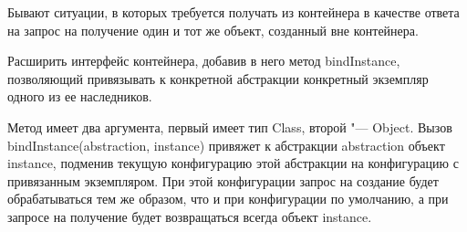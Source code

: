 Бывают ситуации, в которых требуется получать из контейнера в качестве ответа на запрос на получение один и тот же объект, созданный вне контейнера.

\begin{solution}
	Расширить интерфейс контейнера, добавив в него метод bindInstance, позволяющий привязывать к конкретной абстракции конкретный экземпляр одного из ее наследников.
\end{solution}
Метод имеет два аргумента, первый имеет тип Class, второй "--- Object. Вызов bindInstance(abstraction, instance) привяжет к абстракции abstraction объект instance, 
подменив текущую конфигурацию этой абстракции на конфигурацию с привязанным экземпляром. 
При этой конфигурации запрос на создание будет обрабатываться тем же образом, что и при конфигурации по умолчанию, 
а при запросе на получение будет возвращаться всегда объект instance.